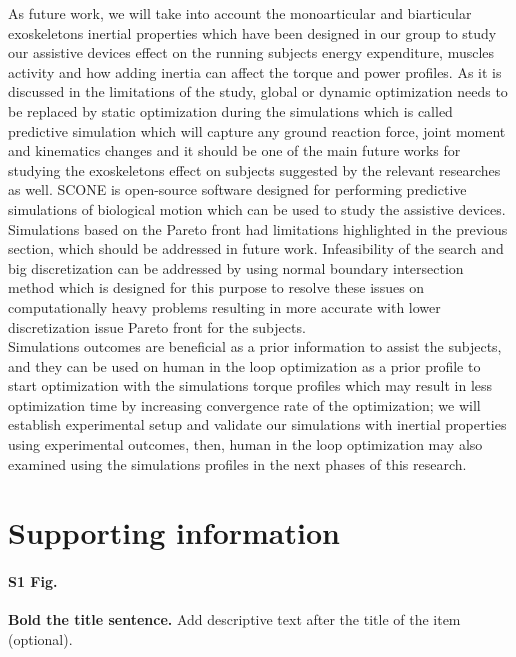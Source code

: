 \documentclass[10pt,letterpaper]{article}
\begin{document}
As future work, we will take into account the monoarticular and biarticular exoskeletons inertial properties which have been designed in our group to study our assistive devices effect on the running subjects energy expenditure, muscles activity and how adding inertia can affect the torque and power profiles. As it is discussed in the limitations of the study, global or dynamic optimization needs to be replaced by static optimization during the simulations which is called predictive simulation \cite{111,112} which will capture any ground reaction force, joint moment and kinematics changes and it should be one of the main future works for studying the exoskeletons effect on subjects suggested by the relevant researches \cite{2,93} as well. SCONE \cite{110} is open-source software designed for performing predictive simulations of biological motion which can be used to study the assistive devices.\\
Simulations based on the Pareto front had limitations highlighted in the previous section, which should be addressed in future work. Infeasibility of the search and big discretization can be addressed by using normal boundary intersection method \cite{108} which is designed for this purpose to resolve these issues on computationally heavy problems resulting in more accurate with lower discretization issue Pareto front for the subjects.\\
Simulations outcomes are beneficial as a prior information to assist the subjects, and they can be used on human in the loop optimization \cite{109} as a prior profile to start optimization with the simulations  torque profiles which may result in less optimization time by increasing convergence rate of the optimization; we will establish experimental setup and validate our simulations with inertial properties using experimental outcomes, then, human in the loop optimization may also examined using the simulations profiles in the next phases of this research.\\
\section*{\textbf{Supporting information}}

\paragraph*{S1 Fig.}
\label{S1_Fig}
{\bf Bold the title sentence.} Add descriptive text after the title of the item (optional).
\end{document}
